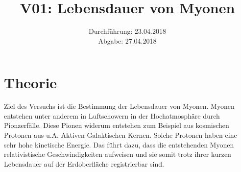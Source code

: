 \documentclass[
  bibliography=totoc,     %
  captions=tableheading,  %
  titlepage=firstiscover, %
]{scrartcl}
\title{V01: Lebensdauer von Myonen}
\author{
  Simon Schulte
  \texorpdfstring{
    \\
    \href{mailto:simon.schulte@udo.edu}{simon.schulte@udo.edu}
  }{}
  \texorpdfstring{\and}{, }
  Tim Sedlaczek
  \texorpdfstring{
    \\
    \href{mailto:tim.sedlaczek@udo.edu}{tim.sedlaczek@udo.edu}
  }{}
}
\date{Durchführung: 23.04.2018\\
      Abgabe: 27.04.2018}
\begin{document}
\maketitle
\thispagestyle{empty}
\setcounter{page}{1}
\section{Theorie}
\label{sec:theorie}
  Ziel des Versuchs ist die Bestimmung der Lebensdauer von Myonen. Myonen
  entstehen unter anderem in Luftschowern in der Hochatmosphäre durch
  Pionzerfälle. Diese Pionen widerum entstehen zum Beispiel aus kosmischen
  Protonen aus u.A. Aktiven Galaktischen Kernen. Solche Protonen haben eine sehr
  hohe kinetische Energie. Das führt dazu, dass die entstehenden Myonen
  relativistische Geschwindigkeiten aufweisen und sie somit trotz ihrer kurzen
  Lebensdauer auf der Erdoberfläche registrierbar sind.
\end{document}
